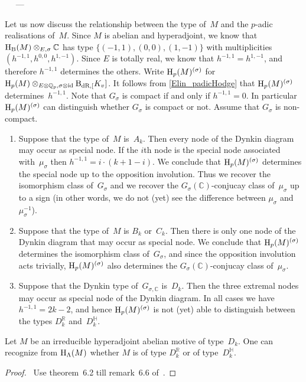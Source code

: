 \documentclass[10pt,twoside,leqno]{article}
\renewcommand{\paragraph}[1]{\par\bigskip\refstepcounter{subsection}%
 {\normalfont\normalsize\scshape\noindent\thesubsection%
 \ifthenelse{\equal{#1}{}}%
 {}%
 {\ \textls{#1.}}%
 \ ---}%
}
\numberwithin{equation}{subsection}
\let\qed\relax
\newcommand{\id}{\textnormal{id}}
\newcommand{\QQ}{\mathbb{Q}}
\newcommand{\QQp}{\QQ_{p}}
\newcommand{\RR}{\mathbb{R}}
\newcommand{\CC}{\mathbb{C}}
\newcommand{\HQ}{\mathbb{H}}
\newcommand{\BdR}[1]{\textnormal{B}_{\dR,#1}}
\newcommand{\dR}{\textnormal{dR}}
\newcommand{\HH}{\textnormal{H}}
\newcommand{\Hp}{\HH_{p}}
\newcommand{\HB}{\HH_{\textnormal{B}}}
\begin{document}
\paragraph{}
Let us now discuss the relationship between the type of~\(M\)
and the \(p\)-adic realisations of~\(M\).
Since \(M\) is abelian and hyperadjoint,
we know that \(\HB(M) \otimes_{E,\sigma} \CC\)
has type \(\{(-1,1), (0,0), (1,-1)\}\) with multiplicities
\((h^{-1,1},h^{0,0},h^{1,-1})\).
Since \(E\) is totally real, we know that \(h^{-1,1} = h^{1,-1}\),
and therefore \(h^{-1,1}\) determines the others.
Write \(\Hp(M)^{(\sigma)}\) for
\(\Hp(M) \otimes_{E \otimes \QQp, \sigma \otimes \id} \BdR[K_{v}]\).
It follows from \cref{Elin_padicHodge}
that \(\Hp(M)^{(\sigma)}\) determines~\(h^{-1,1}\).
Note that \(G_{\sigma}\) is compact if and only if \(h^{-1,1} = 0\).
In particular \(\Hp(M)^{(\sigma)}\) can distinguish whether
\(G_{\sigma}\) is compact or not.
Assume that \(G_{\sigma}\) is non-compact.
\begin{enumerate}
 \item Suppose that the type of~\(M\) is~\(A_{k}\).
  Then every node of the Dynkin diagram may occur as special node.
  If the \(i\)th node is the special node associated with~\(\mu_{\sigma}\)
  then \(h^{-1,1} = i\cdot(k+1-i)\).
  We conclude that \(\Hp(M)^{(\sigma)}\)
  determines the special node up to the opposition involution.
  Thus we recover the isomorphism class of~\(G_{\sigma}\)
  and we recover the \(G_{\sigma}(\CC)\)-conjucay class of~\(\mu_{\sigma}\)
  up to a sign (in other words, we do not (yet)
  see the difference between \(\mu_{\sigma}\) and~\(\mu_{\sigma}^{-1}\)).
 \item Suppose that the type of~\(M\) is \(B_{k}\) or~\(C_{k}\).
  Then there is only one node of the Dynkin diagram
  that may occur as special node.
  We conclude that \(\Hp(M)^{(\sigma)}\) determines
  the isomorphism class of~\(G_{\sigma}\),
  and since the opposition involution acts trivially,
  \(\Hp(M)^{(\sigma)}\) also determines
  the \(G_{\sigma}(\CC)\)-conjucay class of~\(\mu_{\sigma}\).
 \item Suppose that the Dynkin type of~\(G_{\sigma,\CC}\) is~\(D_{k}\).
  Then the three extremal nodes may occur as special node of the Dynkin diagram.
  In all cases we have \(h^{-1,1} = 2k-2\),
  and hence \(\Hp(M)^{(\sigma)}\) is not (yet) able to distinguish
  between the types \(D_{k}^{\RR}\) and~\(D_{k}^{\HQ}\).
\end{enumerate}

\begin{proposition} \label{inputNoot}
 Let \(M\) be an irreducible hyperadjoint abelian motive of type~\(D_{k}\).
 One can recognize from \(\HH_{\Lambda}(M)\)
 whether \(M\) is of type \(D_{k}^{\RR}\) or of type~\(D_{k}^{\HQ}\).
\end{proposition}
\begin{proof}
 \pf\ Use theorem~6.2 till remark~6.6 of~\cite{No06}. \qed
\end{proof}
\end{document}
